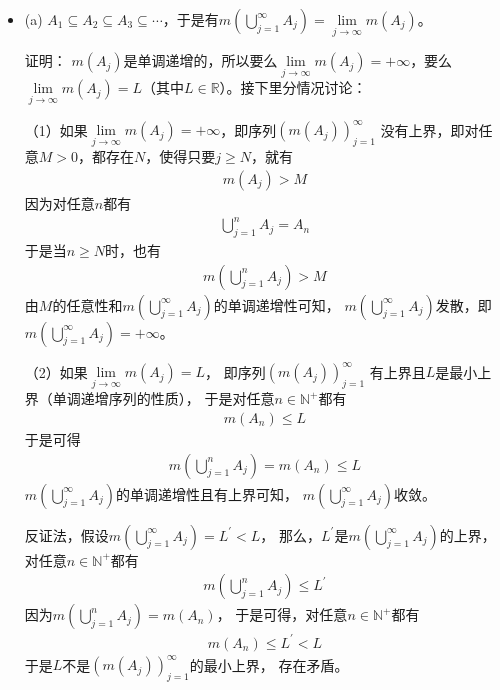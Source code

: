 \documentclass{article}
\begin{document}
\begin{itemize}
  \item (a)
        $A_1 \subseteq A_2 \subseteq A_3 \subseteq \cdots$，于是有$ m(\bigcup\limits_{j = 1}^\infty A_j) = \lim\limits_{j \to \infty} m(A_j)$。

        证明：
        $m(A_j)$是单调递增的，所以要么$\lim\limits_{j \to \infty} m(A_j) = +\infty$，要么
        $\lim\limits_{j \to \infty} m(A_j) = L$（其中$L \in \mathbb{R}$）。接下里分情况讨论：

        （1）如果$\lim\limits_{j \to \infty} m(A_j) = +\infty$，即序列$(m(A_j))_{j = 1}^\infty$
        没有上界，即对任意$M > 0$，都存在$N$，使得只要$j \geq N$，就有
        \begin{align*}
          m(A_j) > M
        \end{align*}
        因为对任意$n$都有
        \begin{align*}
          \bigcup\limits_{j = 1}^n A_j = A_n
        \end{align*}
        于是当$n \geq N$时，也有
        \begin{align*}
          m(\bigcup\limits_{j = 1}^n A_j) > M
        \end{align*}
        由$M$的任意性和$m(\bigcup\limits_{j = 1}^\infty A_j)$的单调递增性可知，
        $m(\bigcup\limits_{j = 1}^\infty A_j)$发散，即$m(\bigcup\limits_{j = 1}^\infty A_j) = +\infty$。

        （2）如果$\lim\limits_{j \to \infty} m(A_j) = L$，
        即序列$(m(A_j))_{j = 1}^\infty$
        有上界且$L$是最小上界（单调递增序列的性质），
        于是对任意$n \in \mathbb{N}^+$都有
        \begin{align*}
          m(A_n) \leq L
        \end{align*}
        于是可得
        \begin{align*}
          m(\bigcup\limits_{j = 1}^n A_j) = m(A_n) \leq L
        \end{align*}
        $m(\bigcup\limits_{j = 1}^\infty A_j)$的单调递增性且有上界可知，
        $m(\bigcup\limits_{j = 1}^\infty A_j)$收敛。

        反证法，假设$m(\bigcup\limits_{j = 1}^\infty A_j) = L^\prime < L$，
        那么，$L^\prime$是$m(\bigcup\limits_{j = 1}^\infty A_j)$的上界，
        对任意$n \in \mathbb{N}^+$都有
        \begin{align*}
          m(\bigcup\limits_{j = 1}^n A_j) \leq L^\prime
        \end{align*}
        因为$m(\bigcup\limits_{j = 1}^n A_j) = m(A_n)$，
        于是可得，对任意$n \in \mathbb{N}^+$都有
        \begin{align*}
          m(A_n) \leq L^\prime < L
        \end{align*}
        于是$L$不是$(m(A_j))_{j = 1}^\infty$的最小上界，
        存在矛盾。


\end{itemize}
\end{document}
